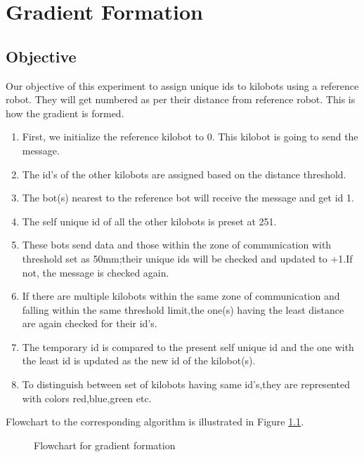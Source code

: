 \documentclass{report}[12pt]
\begin{document}
\chapter{Gradient Formation}
\section{Objective}
Our objective of this experiment to assign unique ids to kilobots using a reference robot. They will get numbered as per their distance from reference robot. This is how the gradient is formed.
\begin{enumerate}
    \item First, we initialize the reference kilobot to 0. This kilobot is going to send the message.
    \item The id's of the other kilobots are assigned based on the distance threshold.
    \item The bot(s) nearest to the reference bot will receive the message and get id 1.
    \item The self unique id of all the other kilobots is preset at 251.
    \item These bots send data and those within the zone of communication with threshold set as 50mm;their unique ids will be checked and updated to +1.If not, the message is checked again.
    \item If there are multiple kilobots within the same zone of communication and falling within the same threshold limit,the one(s) having the least distance are again checked for their id's.
    \item The temporary id is compared to the present self unique id and the one with the least id is updated as the new id of the kilobot(s).
    \item To distinguish between set of kilobots having same id's,they are represented with colors red,blue,green etc.
\end{enumerate}

Flowchart to the corresponding algorithm is illustrated in Figure \ref{fig:flowchart-gradient}.
\begin{figure}[H]
	\centering
	\caption{Flowchart for gradient formation}
	\label{fig:flowchart-gradient}
\end{figure}
\end{document}
